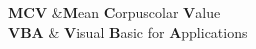 \clearpage
\pagestyle{fancy} %
{
   \textbf{MCV}		&\textbf{M}ean \textbf{C}orpuscolar \textbf{V}alue \\
   \textbf{VBA}    & \textbf{V}isual \textbf{B}asic for \textbf{A}pplications \\
}